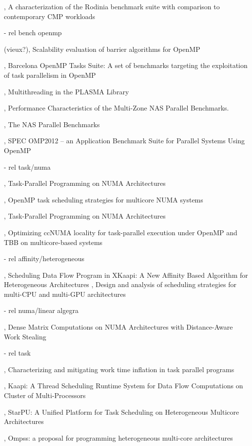 \cite{Rodinia2010}, A characterization of the Rodinia benchmark suite with comparison to contemporary CMP workloads

  - rel bench openmp

(vieux?)\cite{Nanjegowda2009}, Scalability evaluation of barrier algorithms for OpenMP

\cite{Duran2009}, Barcelona OpenMP Tasks Suite: A set of benchmarks targeting the exploitation of task parallelism in OpenMP

\cite{Kurzak2013}, Multithreading in the PLASMA Library

\cite{Jin2004}, Performance Characteristics of the Multi-Zone NAS Parallel Benchmarks.

\cite{Bailey1994}, The NAS Parallel Benchmarks

\cite{Muller2012}, SPEC OMP2012 -- an Application Benchmark Suite for Parallel Systems Using OpenMP

  - rel task/numa

\cite{Wienke2012}, Task-Parallel Programming on NUMA Architectures

\cite{Olivier2012}, OpenMP task scheduling strategies for multicore NUMA systems

\cite{Terboven2012}, Task-Parallel Programming on NUMA Architectures

\cite{Wittmann2011}, Optimizing ccNUMA locality for task-parallel execution under OpenMP and TBB on multicore-based systems


  - rel affinity/heterogeneous

\cite{Bleuse2014}, Scheduling Data Flow Program in XKaapi: A New Affinity Based Algorithm for Heterogeneous Architectures
\cite{Lima2015}, Design and analysis of scheduling strategies for multi-CPU and multi-GPU architectures

  - rel numa/linear algegra

\cite{Al-Omairy2015}, Dense Matrix Computations on NUMA Architectures with Distance-Aware Work Stealing

  - rel task

\cite{Olivier2013}, Characterizing and mitigating work time inflation in task parallel programs

\cite{Gautier2007}, Kaapi: A Thread Scheduling Runtime System for Data Flow Computations on Cluster of Multi-Processors

\cite{StarPU}, StarPU: A Unified Platform for Task Scheduling on Heterogeneous Multicore Architectures

\cite{OMPSs}, Ompss: a proposal for programming heterogeneous multi-core architectures

